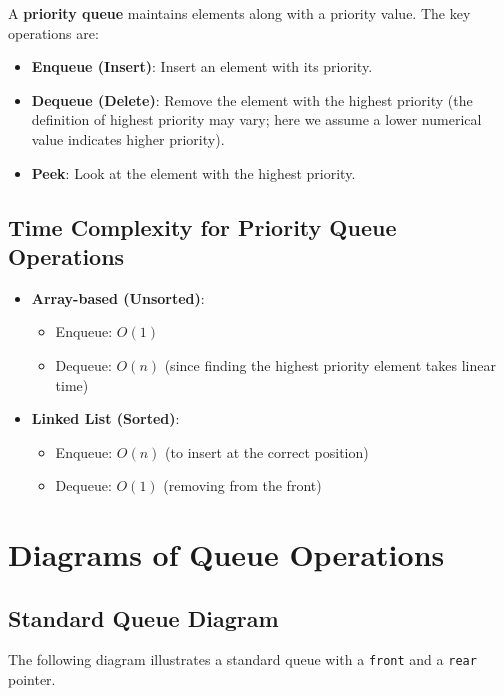 A \textbf{priority queue} maintains elements along with a priority value. The key operations are:
\begin{itemize}
    \item \textbf{Enqueue (Insert)}: Insert an element with its priority.
    \item \textbf{Dequeue (Delete)}: Remove the element with the highest priority (the definition of highest priority may vary; here we assume a lower numerical value indicates higher priority).
    \item \textbf{Peek}: Look at the element with the highest priority.
\end{itemize}

\subsection{Time Complexity for Priority Queue Operations}
\begin{itemize}
    \item \textbf{Array-based (Unsorted)}:
    \begin{itemize}
        \item Enqueue: \( O(1) \)
        \item Dequeue: \( O(n) \) (since finding the highest priority element takes linear time)
    \end{itemize}
    \item \textbf{Linked List (Sorted)}:
    \begin{itemize}
        \item Enqueue: \( O(n) \) (to insert at the correct position)
        \item Dequeue: \( O(1) \) (removing from the front)
    \end{itemize}
\end{itemize}

\section{Diagrams of Queue Operations}
\subsection{Standard Queue Diagram}
The following diagram illustrates a standard queue with a \texttt{front} and a \texttt{rear} pointer.

\begin{center}
\end{center}

